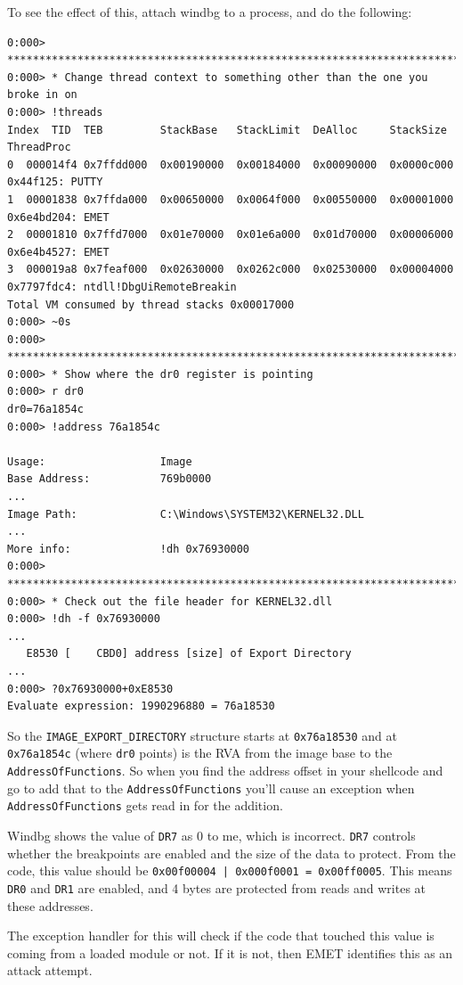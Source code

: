 \documentclass[]{article}
\begin{document}
To see the effect of this, attach windbg to a process, and do the following:

\begin{verbatim}
0:000> *********************************************************************************
0:000> * Change thread context to something other than the one you broke in on
0:000> !threads
Index  TID  TEB         StackBase   StackLimit  DeAlloc     StackSize   ThreadProc
0  000014f4 0x7ffdd000  0x00190000  0x00184000  0x00090000  0x0000c000  0x44f125: PUTTY
1  00001838 0x7ffda000  0x00650000  0x0064f000  0x00550000  0x00001000  0x6e4bd204: EMET
2  00001810 0x7ffd7000  0x01e70000  0x01e6a000  0x01d70000  0x00006000  0x6e4b4527: EMET
3  000019a8 0x7feaf000  0x02630000  0x0262c000  0x02530000  0x00004000  0x7797fdc4: ntdll!DbgUiRemoteBreakin
Total VM consumed by thread stacks 0x00017000
0:000> ~0s
0:000> *********************************************************************************
0:000> * Show where the dr0 register is pointing
0:000> r dr0
dr0=76a1854c
0:000> !address 76a1854c

Usage:                  Image
Base Address:           769b0000
...
Image Path:             C:\Windows\SYSTEM32\KERNEL32.DLL
...
More info:              !dh 0x76930000
0:000> *********************************************************************************
0:000> * Check out the file header for KERNEL32.dll
0:000> !dh -f 0x76930000
...
   E8530 [    CBD0] address [size] of Export Directory
...
0:000> ?0x76930000+0xE8530
Evaluate expression: 1990296880 = 76a18530
\end{verbatim}

So the \texttt{IMAGE\_EXPORT\_DIRECTORY} structure starts at \texttt{0x76a18530}
and at \texttt{0x76a1854c} (where \texttt{dr0} points) is the RVA from the image base to the \texttt{AddressOfFunctions}.  So when you find the address offset in your shellcode and go to add that to the \texttt{AddressOfFunctions} you'll cause an exception when \texttt{AddressOfFunctions} gets read in for the addition.

Windbg shows the value of \texttt{DR7} as 0 to me, which is incorrect.  \texttt{DR7} controls whether the breakpoints are enabled and the size of the data to protect.  From the code, this value should be \texttt{0x00f00004 | 0x000f0001 = 0x00ff0005}.  This means \texttt{DR0} and \texttt{DR1} are enabled, and 4 bytes are protected from reads and writes at these addresses.

The exception handler for this will check if the code that touched this value is coming from a loaded module or not.  If it is not, then EMET identifies this as an attack attempt.
\end{document}
